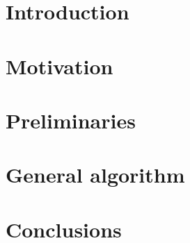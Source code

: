 






\chapter{Introduction}

\chapter{Motivation}

\chapter{Preliminaries}


\chapter{General algorithm}


\chapter{Conclusions}

  \printbibliography[heading=bibintoc] %



